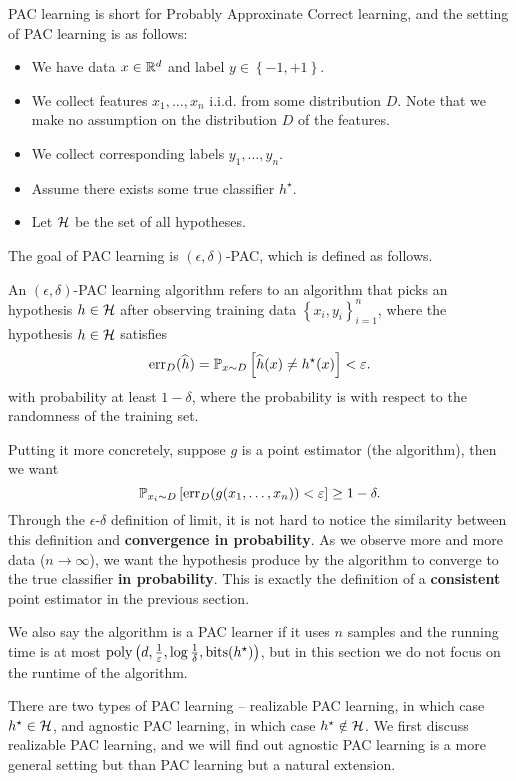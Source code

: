 \documentclass[a4paper]{article}
\begin{document}
PAC learning is short for Probably Approxinate Correct 
learning, and the setting of PAC learning is as follows:
\begin{itemize}
  \item We have data $x \in \mathbb{R}^d$ and label $y \in \left\{ -1, 
  +1 \right\}$. 
  \item We collect features $x_1, \dots, x_n$ i.i.d. from 
  some distribution $D$. Note that we make no assumption on 
  the distribution $D$ of the features. 
  \item We collect corresponding labels $y_1, \dots, y_n$. 
  \item Assume there exists some true classifier $h^\star$.
  \item Let $\mathcal{H}$ be the set of all hypotheses.
\end{itemize}
The goal of PAC learning is $(\epsilon, \delta)$-PAC, 
which is defined as follows. 
\begin{defi}
  An $(\epsilon, \delta)$-PAC learning algorithm
  refers to an algorithm that 
  picks an hypothesis $h \in \mathcal{H}$  
  after observing training data 
  $\left\{ x_i, y_i \right\}_{i=1}^n$,
  where the hypothesis $h \in \mathcal{H}$ satisfies
  \[
  \operatorname{err}_D (\widehat{h}) = 
  \mathbb{P}_{x \sim D} \left[ \widehat{h}(x) \neq h^\star(x) \right]
  < \varepsilon.
  \]
  with probability at least $1 - \delta$, where the probability
  is with respect to the randomness of the training set.
\end{defi}
Putting it more concretely, suppose $g$ is a point estimator
(the algorithm), then we want 
\[
\mathbb{P}_{x_i \sim D} \left[ \operatorname{err}_D (g(x_1, \dots, x_n)) < \varepsilon 
\right] \geq 1 - \delta.
\]
Through the $\epsilon$-$\delta$ definition of limit, 
it is not hard to  
notice the similarity between this definition 
and \textbf{convergence in probability}.
As we observe more and more data ($n \to \infty$), 
we want the hypothesis 
produce by the algorithm to converge to the true classifier
\textbf{in probability}. This is exactly the definition 
of a \textbf{consistent} point estimator in the previous 
section.

We also say the algorithm is a PAC learner if it uses 
$n$ samples and the running time is at most $\operatorname{poly}
\left( d, \frac{1}{\varepsilon}, \log \frac{1}{\delta}, 
\operatorname{bits}(h^\star) \right)$, but in this section we do not 
focus on the runtime of the algorithm.

There are two types of PAC learning -- realizable PAC learning,
in which case $h^\star \in \mathcal{H}$, and agnostic PAC learning, 
in which case $h^\star \notin \mathcal{H}$. We first discuss 
realizable PAC learning, and we will find out agnostic PAC 
learning is a more general setting but than PAC learning
but a natural extension. 
\end{document}
